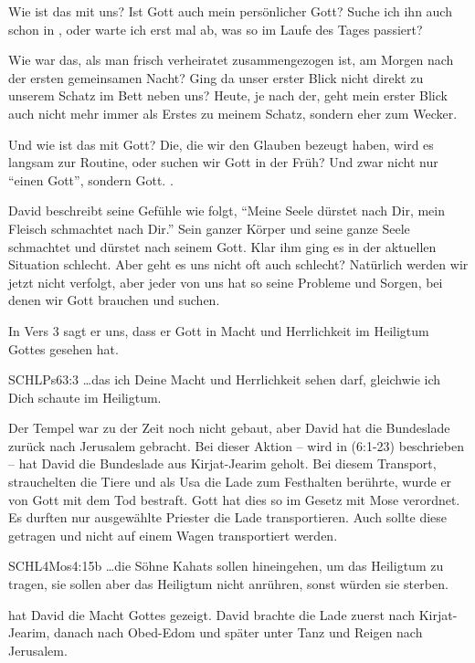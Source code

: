 \documentclass[14pt]{../../inc/mybib}
\begin{document}
    \begin{block}
        Wie ist das mit uns? Ist Gott auch mein persönlicher Gott? Suche ich ihn auch schon in , oder warte ich erst mal ab, was so im Laufe des Tages passiert?

        Wie war das, als man frisch verheiratet zusammengezogen ist, am Morgen nach der ersten gemeinsamen Nacht? Ging da unser erster Blick nicht direkt zu unserem Schatz im Bett neben uns? Heute, je nach der, geht mein erster Blick auch nicht mehr immer als Erstes zu meinem Schatz, sondern eher zum Wecker.

        Und wie ist das mit  Gott? Die, die wir den Glauben bezeugt haben, wird es langsam zur Routine, oder suchen wir Gott in der Früh? Und zwar nicht nur \enquote{einen Gott}, sondern  Gott. .

        David beschreibt seine Gefühle wie folgt, \enquote{Meine Seele dürstet nach Dir, mein Fleisch schmachtet nach Dir.} Sein ganzer Körper und seine ganze Seele schmachtet und dürstet nach seinem Gott. Klar ihm ging es in der aktuellen Situation schlecht. Aber geht es uns nicht oft auch schlecht? Natürlich werden wir jetzt nicht verfolgt, aber jeder von uns hat so seine Probleme und Sorgen, bei denen wir Gott brauchen und suchen.
    \end{block}

    \begin{block}
        In Vers 3 sagt er uns, dass er Gott in Macht und Herrlichkeit im Heiligtum Gottes gesehen hat.
        \begin{bibelbox}{SCHL}{Ps}{63:3}
            \dots das ich Deine Macht und Herrlichkeit sehen darf, gleichwie ich Dich schaute im Heiligtum.
        \end{bibelbox}
        Der Tempel war zu der Zeit noch nicht gebaut, aber David hat die Bundeslade zurück nach Jerusalem gebracht. Bei dieser Aktion -- wird in (6:1-23) beschrieben -- hat David die Bundeslade aus Kirjat-Jearim geholt. Bei diesem Transport, strauchelten die Tiere und als Usa die Lade zum Festhalten berührte, wurde er von Gott mit dem Tod bestraft. Gott hat dies so im Gesetz mit Mose verordnet. Es durften nur ausgewählte Priester die Lade transportieren. Auch sollte diese getragen und nicht auf einem Wagen transportiert werden.
        \begin{bibelbox}{SCHL}{4Mos}{4:15b}
            \dots die Söhne Kahats sollen hineingehen, um das Heiligtum zu tragen, sie sollen aber das Heiligtum nicht anrühren, sonst würden sie sterben.
        \end{bibelbox}
         hat David die Macht Gottes gezeigt. David brachte die Lade zuerst nach Kirjat-Jearim, danach nach Obed-Edom und später unter Tanz und Reigen nach Jerusalem.
    \end{block}
\end{document}
